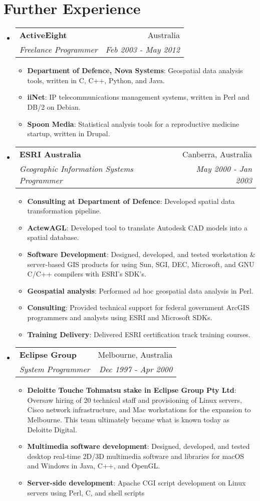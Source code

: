 \documentclass[11pt]{article}
\makeatletter
\newcommand{\resumeItem}[2]{
  \item\small{
    \textbf{#1}{: #2 \vspace{-2pt}}
  }
}
\newcommand{\resumeSubheading}[4]{
  \vspace{-1pt}\item
    \begin{tabular*}{0.97\textwidth}[t]{l@{\extracolsep{\fill}}r}
      \textbf{#1} & #2 \\
      \textit{\small#3} & \textit{\small #4} \\
    \end{tabular*}\vspace{-5pt}
}
\newcommand{\resumeSubHeadingListStart}{\begin{itemize}[leftmargin=*]}
\newcommand{\resumeSubHeadingListEnd}{\end{itemize}}
\newcommand{\resumeItemListStart}{\begin{itemize}}
\newcommand{\resumeItemListEnd}{\end{itemize}\vspace{-5pt}}
\makeatother
\begin{document}
\section{Further Experience}
  \resumeSubHeadingListStart
    \resumeSubheading
        {ActiveEight}{Australia}
        {Freelance Programmer}{Feb 2003 - May 2012}
        \resumeItemListStart
          \resumeItem{Department of Defence, Nova Systems}
            {Geospatial data analysis tools, written in C, C++, Python, and Java.}
          \resumeItem{iiNet}
            {IP telecommunications management systems, written in Perl and DB/2 on Debian.}
          \resumeItem{Spoon Media}
            {Statistical analysis tools for a reproductive medicine startup, written in Drupal.}
        \resumeItemListEnd

    \resumeSubheading
      {ESRI Australia}{Canberra, Australia}
      {Geographic Information Systems Programmer}{May 2000 - Jan 2003}
        \resumeItemListStart
          \resumeItem{Consulting at Department of Defence}
            {Developed spatial data transformation pipeline.}
          \resumeItem{ActewAGL}
            {Developed tool to translate Autodesk CAD models into a spatial database.}
          \resumeItem{Software Development}
            {Designed, developed, and tested workstation \& server-based GIS products for using Sun, SGI, DEC, Microsoft, and GNU C/C++ compilers with ESRI's SDK's.}
          \resumeItem{Geospatial analysis}
            {Performed ad hoc geospatial data analysis in Perl.}
          \resumeItem{Consulting}
            {Provided technical support for federal government ArcGIS programmers and analysts using ESRI and Microsoft SDKs.}
          \resumeItem{Training Delivery}
            {Delivered ESRI certification track training courses.}
        \resumeItemListEnd

    \resumeSubheading
      {Eclipse Group}{Melbourne, Australia}
      {System Programmer}{Dec 1997 - Apr 2000}
        \resumeItemListStart
        \resumeItem{Deloitte Touche Tohmatsu stake in Eclipse Group Pty Ltd}
          {Oversaw hiring of 20 technical staff and provisioning of Linux servers, Cisco network infrastructure, and Mac workstations for the expansion to Melbourne. This team ultimately became what is known today as Deloitte Digital.}
        \resumeItem{Multimedia software development}
          {Designed, developed, and tested desktop real-time 2D/3D multimedia software and libraries for macOS and Windows in Java, C++, and OpenGL.}
        \resumeItem{Server-side development}
          {Apache CGI script development on Linux servers using Perl, C, and shell scripts}
        \resumeItemListEnd
    \resumeSubHeadingListEnd
\end{document}
